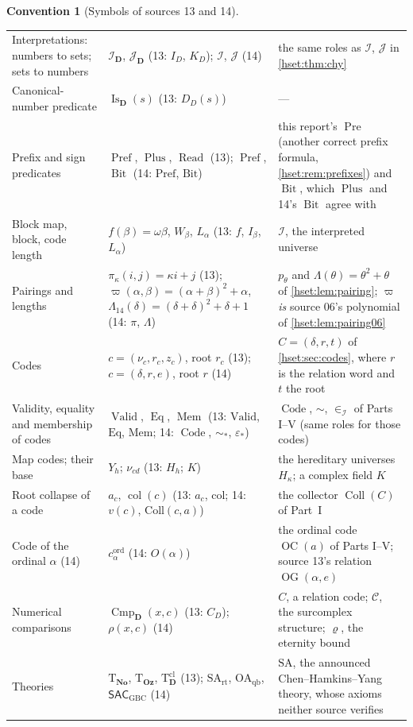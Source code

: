 \documentclass[11pt,letterpaper]{article}
\theoremstyle{definition}
\newtheorem{convention}[convention]{Convention}\aliascntresetthe{convention}
\theoremstyle{remark}
\newcommand{\No}{\mathbf{No}}
\newcommand{\C}{\mathcal C}
\newcommand{\I}{\mathcal I}
\newcommand{\J}{\mathcal J}
\newcommand{\Code}{\operatorname{Code}}
\newcommand{\Bit}{\operatorname{Bit}}
\newcommand{\Pre}{\operatorname{Pre}}
\newcommand{\Coll}{\operatorname{Coll}}
\newcommand{\OC}{\operatorname{OC}}
\newcommand{\Oz}{\mathbf{Oz}}
\newcommand{\GBC}{\mathrm{GBC}}
\newcommand{\SAth}{\mathrm{SA}}
\newcommand{\Prefp}{\operatorname{Pref}}
\newcommand{\Plusp}{\operatorname{Plus}}
\newcommand{\Readp}{\operatorname{Read}}
\newcommand{\Valid}{\operatorname{Valid}}
\newcommand{\Eqc}{\operatorname{Eq}}
\newcommand{\Memc}{\operatorname{Mem}}
\newcommand{\OG}{\operatorname{OG}}
\newcommand{\Cmp}{\operatorname{Cmp}}
\newcommand{\Dd}{\mathbf{D}}
\newcommand{\Tth}{\mathrm{T}}
\newcommand{\SArt}{\mathrm{SA}_{\mathrm{rt}}}
\newcommand{\OAqb}{\mathrm{OA}_{\mathrm{qb}}}
\begin{document}
\begin{convention}[Symbols of sources 13 and 14]
\begin{center}
\begin{longtable}{@{}P{0.25\textwidth}P{0.27\textwidth}P{0.40\textwidth}@{}}
Interpretations: numbers to sets; sets to numbers & $\I_{\Dd}$, $\J_{\Dd}$ (13: $I_D$, $K_D$); $\I$, $\J$ (14) & the same roles as $\I$, $\J$ in \cref{hset:thm:chy}\\
Canonical-number predicate & $\operatorname{Is}_{\Dd}(s)$ (13: $D_D(s)$) & ---\\
Prefix and sign predicates & $\Prefp$, $\Plusp$, $\Readp$ (13); $\Prefp$, $\Bit$ (14: $\mathrm{Pref}$, $\mathrm{Bit}$) & this report's $\Pre$ (another correct prefix formula, \cref{hset:rem:prefixes}) and $\Bit$, which $\Plusp$ and 14's $\Bit$ agree with\\
Block map, block, code length & $f(\beta)=\omega\beta$, $W_\beta$, $L_\alpha$ (13: $f$, $I_\beta$, $L_\alpha$) & $\I$, the interpreted universe\\
Pairings and lengths & $\pi_\kappa(i,j)=\kappa i+j$ (13); $\varpi(\alpha,\beta)=(\alpha+\beta)^2+\alpha$, $\Lambda_{14}(\delta)=(\delta+\delta)^2+\delta+1$ (14: $\pi$, $\Lambda$) & $p_\theta$ and $\Lambda(\theta)=\theta^2+\theta$ of \cref{hset:lem:pairing}; $\varpi$ \emph{is} source 06's polynomial of \cref{hset:lem:pairing06}\\
Codes & $c=(\nu_c,r_c,z_c)$, root $r_c$ (13); $c=(\delta,r,e)$, root $r$ (14) & $C=(\delta,r,t)$ of \cref{hset:sec:codes}, where $r$ is the relation word and $t$ the root\\
Validity, equality and membership of codes & $\Valid$, $\Eqc$, $\Memc$ (13: $\mathrm{Valid}$, $\mathrm{Eq}$, $\mathrm{Mem}$; 14: $\Code$, $\sim_*$, $\varepsilon_*$) & $\Code$, $\sim$, $\in_\I$ of Parts I--V (same roles for those codes)\\
Map codes; their base & $Y_h$; $\nu_{cd}$ (13: $H_h$; $K$) & the hereditary universes $H_\kappa$; a complex field $K$\\
Root collapse of a code & $a_c$, $\operatorname{col}(c)$ (13: $a_c$, $\mathrm{col}$; 14: $v(c)$, $\mathrm{Coll}(c,a)$) & the collector $\Coll(C)$ of Part~I\\
Code of the ordinal $\alpha$ (14) & $c^{\mathrm{ord}}_\alpha$ (14: $O(\alpha)$) & the ordinal code $\OC(a)$ of Parts I--V; source 13's relation $\OG(\alpha,e)$\\
Numerical comparisons & $\Cmp_{\Dd}(x,c)$ (13: $C_D$); $\rho(x,c)$ (14) & $C$, a relation code; $\C$, the surcomplex structure; $\varrho$, the eternity bound\\
Theories & $\Tth_{\No}$, $\Tth_{\Oz}$, $\Tth^{\mathrm{cl}}_{\Dd}$ (13); $\SArt$, $\OAqb$, $\mathsf{SAC}_{\GBC}$ (14) & $\SAth$, the announced Chen--Hamkins--Yang theory, whose axioms neither source verifies\\

\end{longtable}
\end{center}
\end{convention}
\end{document}
